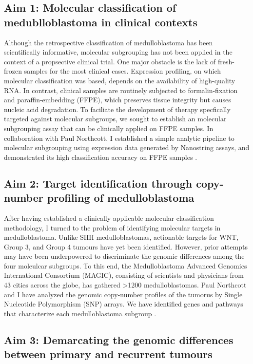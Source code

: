 \documentclass[11pt,letterpaper]{article}
\theoremstyle{definition}
\begin{document}
\subsection{Aim 1: Molecular classification of medublloblastoma in clinical contexts}

Although the retrospective classification of medulloblastoma has been scientifically informative, molecular subgrouping has not been applied in the context of a propsective clinical trial. One major obstacle is the lack of fresh-frozen samples for the most clinical cases. Expression profiling, on which molecular classification was based, depends on the availability of high-quality RNA. In contrast, clinical samples are routinely subjected to formalin-fixation and paraffin-embedding (FFPE), which preserves tissue integrity but causes nucleic acid degradation. To faciliate the development of therapy specfically targeted against molecular subgroups, we sought to establish an molecular subgrouping assay that can be clinically applied on FFPE samples. In collaboration with Paul Northcott, I established a simple analytic pipeline to molecular subgrouping using expression data generated by Nanostring assays, and demonstrated its high classification accuracy on FFPE samples .

\subsection{Aim 2: Target identification through copy-number profiling of medulloblastoma}

After having established a clinically applicable molecular classification methodology, I turned to the problem of identifying molecular targets in medulloblastoma. Unlike SHH medulloblastomas, actionable targets for WNT, Group 3, and Group 4 tumours have yet been identified. However, prior attempts may have been underpowered to discriminate the genomic differences among the four moleulcar subgroups. To this end, the Medulloblastoma Advanced Genomics International Consortium (MAGIC), consisting of scientists and physicians from 43 cities across the globe, has gathered >1200 medulloblastomas. Paul Northcott and I have analyzed the genomic copy-number profiles of the tumorus by Single Nucleotide Polymorphism (SNP) arrays. We have identified genes and pathways that characterize each medulloblastoma subgroup .

\subsection{Aim 3: Demarcating the genomic differences between primary and recurrent tumours}
\end{document}
